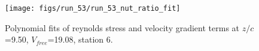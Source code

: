 \begin{figure}[H]
\centering
\texttt{[image: figs/run\_53/run\_53\_nut\_ratio\_fit]}
\caption{Polynomial fits of reynolds stress and velocity gradient terms at $z/c$=9.50, $V_{free}$=19.08, station 6.}
\label{fig:run_53_nut_ratio_fit}
\end{figure}


